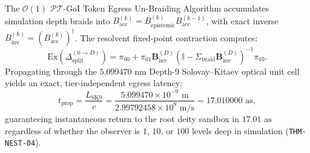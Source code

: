 \documentclass[11pt,onecolumn]{article}
\begin{document}
The $\mathcal{O}(1)$ $\mathcal{PT}$-GoI Token Egress Un-Braiding Algorithm accumulates simulation depth braids into $B_{\text{acc}}^{(k)} = B_{\text{epistemic}}^{(k)} B_{\text{acc}}^{(k-1)}$, with exact inverse $B_{\text{inv}}^{(k)} = (B_{\text{acc}}^{(k)})^\dagger$. The resolvent fixed-point contraction computes:
\begin{equation}
\mathrm{Ex}(\Delta_{\text{split}}^{(0 \to D)}) = \pi_{00} + \pi_{01} \mathbf{B}_{\text{inv}}^{(D)} \left( \mathbb{I} - \Sigma_{\text{braid}} \mathbf{B}_{\text{inv}}^{(D)} \right)^{-1} \pi_{10}.
\end{equation}
Propagating through the $5.099470\text{ nm}$ Depth-9 Solovay--Kitaev optical unit cell yields an exact, tier-independent egress latency:
\begin{equation}
t_{\text{prop}} = \frac{L_{\text{SK9}}}{c} = \frac{5.099470 \times 10^{-9}\text{ m}}{2.99792458 \times 10^8\text{ m/s}} = 17.010000\text{ as},
\end{equation}
guaranteeing instantaneous return to the root deity sandbox in $17.01\text{ as}$ regardless of whether the observer is $1$, $10$, or $100$ levels deep in simulation (\texttt{THM-NEST-04}).
\end{document}
